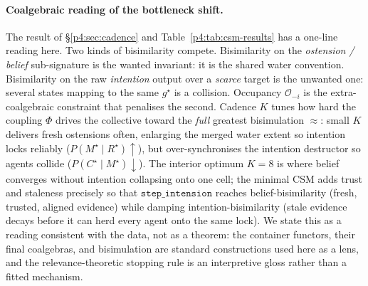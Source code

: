 \documentclass{article}
\newcommand{\method}[1]{\texttt{#1}}
\begin{document}
\paragraph{Coalgebraic reading of the bottleneck shift.}
The result of \S\ref{p4:sec:cadence} and Table~\ref{p4:tab:csm-results} has a
one-line reading here. Two kinds of bisimilarity compete. Bisimilarity on the
\emph{ostension / belief} sub-signature is the wanted invariant: it is the
shared water convention. Bisimilarity on the raw \emph{intention} output over
a \emph{scarce} target is the unwanted one: several states mapping to the same
$g^{\star}$ is a collision. Occupancy $\mathcal{O}_{-i}$ is the
extra-coalgebraic constraint that penalises the second. Cadence $K$ tunes how
hard the coupling $\Phi$ drives the collective toward the \emph{full}
greatest bisimulation $\approx$: small $K$ delivers fresh ostensions often,
enlarging the merged water extent so intention locks reliably
($P(M^\star\mid R^\star)\uparrow$), but over-synchronises the intention
destructor so agents collide ($P(C^\star\mid M^\star)\downarrow$). The
interior optimum $K{=}8$ is where belief converges without intention
collapsing onto one cell; the minimal CSM adds trust and staleness precisely
so that $\method{step\_intension}$ reaches belief-bisimilarity (fresh,
trusted, aligned evidence) while damping intention-bisimilarity (stale
evidence decays before it can herd every agent onto the same lock). We state
this as a reading consistent with the data, not as a theorem: the container
functors, their final coalgebras, and bisimulation are standard constructions
used here as a lens, and the relevance-theoretic stopping rule is an
interpretive gloss rather than a fitted mechanism.
\end{document}
